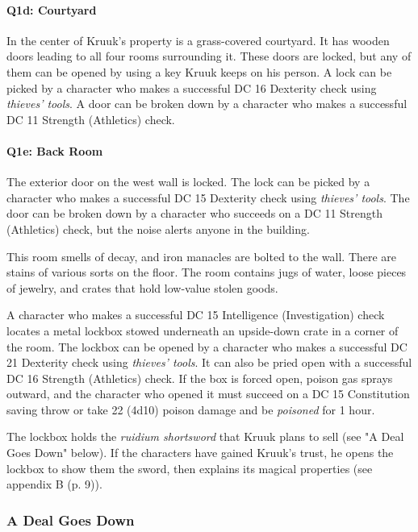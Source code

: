 \documentclass[letterpaper, 11pt, bg=full, twocolumn]{dndbook}
\begin{document}
\paragraph{Q1d: Courtyard}

In the center of Kruuk's property is a grass-covered courtyard. It has wooden doors leading to all four rooms surrounding it. These doors are locked, but any of them can be opened by using a key Kruuk keeps on his person. A lock can be picked by a character who makes a successful DC 16 Dexterity check using \textit{thieves' tools}. A door can be broken down by a character who makes a successful DC 11 Strength (Athletics) check.

\paragraph{Q1e: Back Room}

The exterior door on the west wall is locked. The lock can be picked by a character who makes a successful DC 15 Dexterity check using \textit{thieves' tools}. The door can be broken down by a character who succeeds on a DC 11 Strength (Athletics) check, but the noise alerts anyone in the building.

This room smells of decay, and iron manacles are bolted to the wall. There are stains of various sorts on the floor. The room contains jugs of water, loose pieces of jewelry, and crates that hold low-value stolen goods.

A character who makes a successful DC 15 Intelligence (Investigation) check locates a metal lockbox stowed underneath an upside-down crate in a corner of the room. The lockbox can be opened by a character who makes a successful DC 21 Dexterity check using \textit{thieves' tools}. It can also be pried open with a successful DC 16 Strength (Athletics) check. If the box is forced open, poison gas sprays outward, and the character who opened it must succeed on a DC 15 Constitution saving throw or take 22 (4d10) poison damage and be \textit{poisoned} for 1 hour.

The lockbox holds the \textit{ruidium shortsword} that Kruuk plans to sell (see "A Deal Goes Down" below). If the characters have gained Kruuk's trust, he opens the lockbox to show them the sword, then explains its magical properties (see appendix B (p. 9)).

\subsubsection{A Deal Goes Down}
\end{document}
